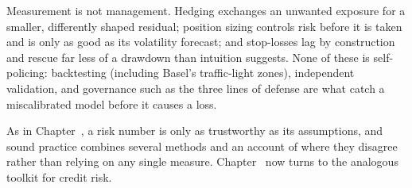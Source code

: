 \documentclass[../ai_in_finance]{subfiles}
\begin{document}
Measurement is not management. Hedging exchanges an unwanted exposure for a smaller, differently shaped residual; position sizing controls risk before it is taken and is only as good as its volatility forecast; and stop-losses lag by construction and rescue far less of a drawdown than intuition suggests. None of these is self-policing: backtesting (including Basel's traffic-light zones), independent validation, and governance such as the three lines of defense are what catch a miscalibrated model before it causes a loss.

As in Chapter~, a risk number is only as trustworthy as its assumptions, and sound practice combines several methods and an account of where they disagree rather than relying on any single measure. Chapter~ now turns to the analogous toolkit for credit risk.

\end{document}
